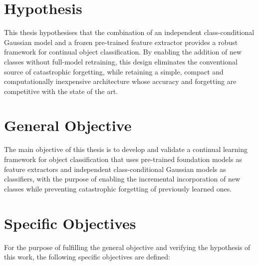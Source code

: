 \section{Hypothesis}

This thesis hypothesises that the combination of an independent class-conditional Gaussian model and a frozen pre-trained feature extractor provides a robust framework for continual object classification. By enabling the addition of new classes without full-model retraining, this design eliminates the conventional source of catastrophic forgetting, while retaining a simple, compact and computationally inexpensive architecture whose accuracy and forgetting are competitive with the state of the art.

\section{General Objective}

The main objective of this thesis is to develop and validate a continual learning framework for object classification that uses pre-trained foundation models as feature extractors and independent class-conditional Gaussian models as classifiers, with the purpose of enabling the incremental incorporation of new classes while preventing catastrophic forgetting of previously learned ones.

\section{Specific Objectives}

For the purpose of fulfilling the general objective and verifying the hypothesis of this work, the following specific objectives are defined:

